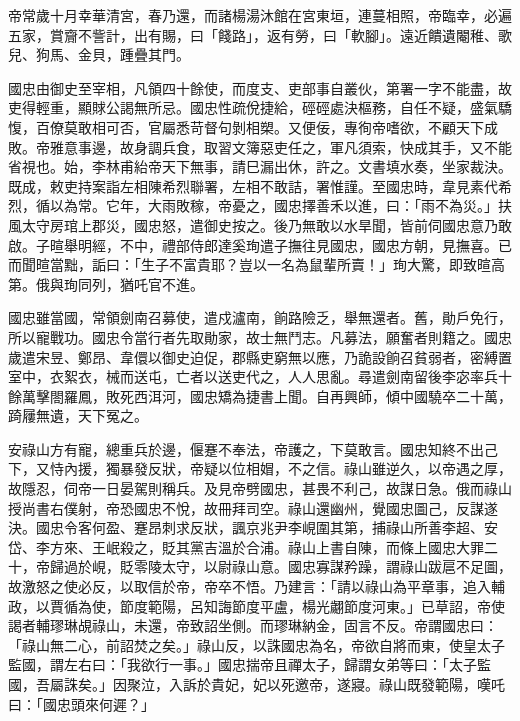 \begin{pinyinscope}
 帝常歲十月幸華清宮，春乃還，而諸楊湯沐館在宮東垣，連蔓相照，帝臨幸，必遍五家，賞齎不訾計，出有賜，曰「餞路」，返有勞，曰「軟腳」。遠近饋遺閹稚、歌兒、狗馬、金貝，踵疊其門。



 國忠由御史至宰相，凡領四十餘使，而度支、吏部事自叢伙，第署一字不能盡，故吏得輕重，顯賕公謁無所忌。國忠性疏侻捷給，硜硜處決樞務，自任不疑，盛氣驕愎，百僚莫敢相可否，官屬悉苛督句剝相槊。又便佞，專徇帝嗜欲，不顧天下成敗。帝雅意事邊，故身調兵食，取習文簿惡吏任之，軍凡須索，快成其手，又不能省視也。始，李林甫紿帝天下無事，請巳漏出休，許之。文書填水奏，坐家裁決。既成，敕吏持案詣左相陳希烈聯署，左相不敢詰，署惟謹。至國忠時，韋見素代希烈，循以為常。它年，大雨敗稼，帝憂之，國忠擇善禾以進，曰：「雨不為災。」扶風太守房琯上郡災，國忠怒，遣御史按之。後乃無敢以水旱聞，皆前伺國忠意乃敢啟。子暄舉明經，不中，禮部侍郎達奚珣遣子撫往見國忠，國忠方朝，見撫喜。已而聞暄當黜，詬曰：「生子不富貴耶？豈以一名為鼠輩所賣！」珣大驚，即致暄高第。俄與珣同列，猶吒官不進。



 國忠雖當國，常領劍南召募使，遣戍瀘南，餉路險乏，舉無還者。舊，勛戶免行，所以寵戰功。國忠令當行者先取勛家，故士無鬥志。凡募法，願奮者則籍之。國忠歲遣宋昱、鄭昂、韋儇以御史迫促，郡縣吏窮無以應，乃詭設餉召貧弱者，密縛置室中，衣絮衣，械而送屯，亡者以送吏代之，人人思亂。尋遣劍南留後李宓率兵十餘萬擊閤羅鳳，敗死西洱河，國忠矯為捷書上聞。自再興師，傾中國驍卒二十萬，踦屨無遺，天下冤之。



 安祿山方有寵，總重兵於邊，偃蹇不奉法，帝護之，下莫敢言。國忠知終不出己下，又恃內援，獨暴發反狀，帝疑以位相媢，不之信。祿山雖逆久，以帝遇之厚，故隱忍，伺帝一日晏駕則稱兵。及見帝劈國忠，甚畏不利己，故謀日急。俄而祿山授尚書右僕射，帝恐國忠不悅，故冊拜司空。祿山還幽州，覺國忠圖己，反謀遂決。國忠令客何盈、蹇昂刺求反狀，諷京兆尹李峴圍其第，捕祿山所善李超、安岱、李方來、王岷殺之，貶其黨吉溫於合浦。祿山上書自陳，而條上國忠大罪二十，帝歸過於峴，貶零陵太守，以尉祿山意。國忠寡謀矜躁，謂祿山跋扈不足圖，故激怒之使必反，以取信於帝，帝卒不悟。乃建言：「請以祿山為平章事，追入輔政，以賈循為使，節度範陽，呂知誨節度平盧，楊光翽節度河東。」已草詔，帝使謁者輔璆琳覘祿山，未還，帝致詔坐側。而璆琳納金，固言不反。帝謂國忠曰：「祿山無二心，前詔焚之矣。」祿山反，以誅國忠為名，帝欲自將而東，使皇太子監國，謂左右曰：「我欲行一事。」國忠揣帝且禪太子，歸謂女弟等曰：「太子監國，吾屬誅矣。」因聚泣，入訴於貴妃，妃以死邀帝，遂寢。祿山既發範陽，嘆吒曰：「國忠頭來何遲？」




\end{pinyinscope}
